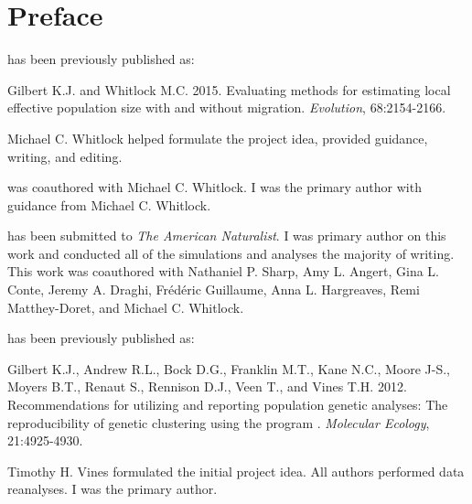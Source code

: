 \chapter*{Preface}


\textsc{} has been previously published as:
%
\begin{previouspaper}
  Gilbert K.J. and Whitlock M.C. 2015. Evaluating methods for estimating local effective 
  population size with and without migration. \emph{Evolution}, 68:2154-2166.
\end{previouspaper}
%
Michael C. Whitlock helped formulate the project idea, provided guidance, writing, and editing.

\textsc{} was coauthored with Michael C. Whitlock. I was the primary author with guidance from Michael C. Whitlock.

\textsc{} has been submitted to \emph{The American Naturalist}. I was primary author on this work and conducted all of the simulations and analyses the majority of writing. This work was coauthored with Nathaniel P. Sharp, Amy L. Angert, Gina L. Conte, Jeremy A. Draghi, Fr\'ed\'eric Guillaume, Anna L. Hargreaves, Remi Matthey-Doret, and Michael C. Whitlock.

\textsc{} has been previously published as:
%
\begin{previouspaper}
  Gilbert K.J., Andrew R.L., Bock D.G., Franklin M.T., Kane N.C., Moore J-S., Moyers B.T., Renaut S., Rennison D.J., Veen T., and Vines T.H. 2012. Recommendations for utilizing and reporting population genetic analyses: The reproducibility of genetic clustering using the program . \emph{Molecular Ecology}, 21:4925-4930.
\end{previouspaper}
%
Timothy H. Vines formulated the initial project idea. All authors performed data reanalyses. I was the primary author.

